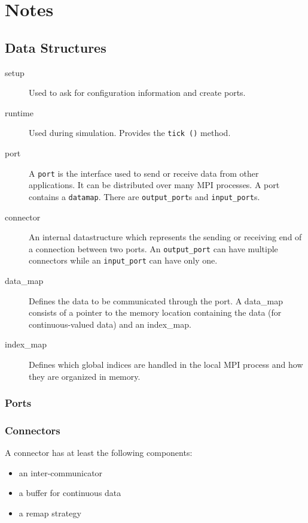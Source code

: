 \documentclass[a4paper]{report}
\begin{document}
\chapter{Notes}

\section{Data Structures}

\begin{description}
  \item[setup] Used to ask for configuration information and create
    ports.
  \item[runtime] Used during simulation.  Provides the \lstinline|tick ()|
    method.
  \item[port] A \lstinline|port| is the interface used to send or receive
    data from other applications.  It can be distributed over many MPI
    processes.  A port contains a \lstinline|datamap|.  There are
    \lstinline|output_port|s and \lstinline|input_port|s.
  \item[connector] An internal datastructure which represents the
    sending or receiving end of a connection between two ports.  An
    \lstinline|output_port| can have multiple connectors while an
    \lstinline|input_port| can have only one.
  \item[data\_map] Defines the data to be communicated through the
    port.  A data\_map consists of a pointer to the memory location
    containing the data (for continuous-valued data) and an
    index\_map.
  \item[index\_map] Defines which global indices are handled in the
    local MPI process and how they are organized in memory.
\end{description}

\subsection{Ports}

\subsection{Connectors}

A connector has at least the following components:
\begin{itemize}
  \item an inter-communicator
  \item a buffer for continuous data
  \item a remap strategy
\end{itemize}
\end{document}
